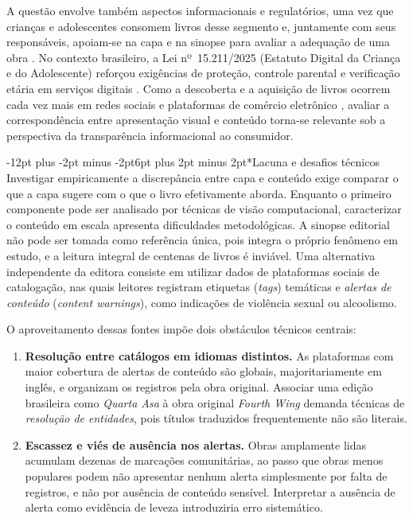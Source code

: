 \documentclass[12pt]{article}
\makeatletter
\renewcommand{\subsection}{\@startsection{subsection}{2}{\z@}%
  {-12pt plus -2pt minus -2pt}{6pt plus 2pt minus 2pt}{\normalfont\normalsize\bfseries}}
\makeatother
\begin{document}
A questão envolve também aspectos informacionais e regulatórios, uma vez que crianças e adolescentes consomem livros desse segmento e, juntamente com seus responsáveis, apoiam-se na capa e na sinopse para avaliar a adequação de uma obra \cite{TODO-exposicao-conteudo}. No contexto brasileiro, a Lei nº~15.211/2025 (Estatuto Digital da Criança e do Adolescente) reforçou exigências de proteção, controle parental e verificação etária em serviços digitais \cite{TODO-lei15211}. Como a descoberta e a aquisição de livros ocorrem cada vez mais em redes sociais e plataformas de comércio eletrônico \cite{TODO-social-media-livros}, avaliar a correspondência entre apresentação visual e conteúdo torna-se relevante sob a perspectiva da transparência informacional ao consumidor.

\subsection*{Lacuna e desafios técnicos}
Investigar empiricamente a discrepância entre capa e conteúdo exige comparar o que a capa sugere com o que o livro efetivamente aborda. Enquanto o primeiro componente pode ser analisado por técnicas de visão computacional, caracterizar o conteúdo em escala apresenta dificuldades metodológicas. A sinopse editorial não pode ser tomada como referência única, pois integra o próprio fenômeno em estudo, e a leitura integral de centenas de livros é inviável. Uma alternativa independente da editora consiste em utilizar dados de plataformas sociais de catalogação, nas quais leitores registram etiquetas (\emph{tags}) temáticas e \emph{alertas de conteúdo} (\emph{content warnings}), como indicações de violência sexual ou alcoolismo.

O aproveitamento dessas fontes impõe dois obstáculos técnicos centrais:
\begin{enumerate}
  \item \textbf{Resolução entre catálogos em idiomas distintos.} As plataformas com maior cobertura de alertas de conteúdo são globais, majoritariamente em inglês, e organizam os registros pela obra original. Associar uma edição brasileira como \emph{Quarta Asa} à obra original \emph{Fourth Wing} demanda técnicas de \emph{resolução de entidades}, pois títulos traduzidos frequentemente não são literais.
  \item \textbf{Escassez e viés de ausência nos alertas.} Obras amplamente lidas acumulam dezenas de marcações comunitárias, ao passo que obras menos populares podem não apresentar nenhum alerta simplesmente por falta de registros, e não por ausência de conteúdo sensível. Interpretar a ausência de alerta como evidência de leveza introduziria erro sistemático.
\end{enumerate}
\end{document}
